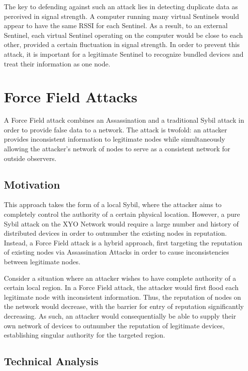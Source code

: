 \documentclass{article}
\begin{document}
The key to defending against such an attack lies in detecting duplicate data as perceived in signal strength. A computer running many virtual Sentinels would appear to have the same RSSI for each Sentinel. As a result, to an external Sentinel, each virtual Sentinel operating on the computer would be close to each other, provided a certain fluctuation in signal strength. In order to prevent this attack, it is important for a legitimate Sentinel to recognize bundled devices and treat their information as one node.

\section{Force Field Attacks}
A Force Field attack combines an Assassination and a traditional Sybil attack in order to provide false data to a network. The attack is twofold: an attacker provides inconsistent information to legitimate nodes while simultaneously allowing the attacker's network of nodes to serve as a consistent network for outside observers.

\subsection{Motivation}

This approach takes the form of a local Sybil, where the attacker aims to completely control the authority of a certain physical location. However, a pure Sybil attack on the XYO Network would require a large number and history of distributed devices in order to outnumber the existing nodes in reputation. Instead, a Force Field attack is a hybrid approach, first targeting the reputation of existing nodes via Assassination Attacks in order to cause inconsistencies between legitimate nodes.

Consider a situation where an attacker wishes to have complete authority of a certain local region. In a Force Field attack, the attacker would first flood each legitimate node with inconsistent information. Thus, the reputation of nodes on the network would decrease, with the barrier for entry of reputation significantly decreasing. As such, an attacker would consequentially be able to supply their own network of devices to outnumber the reputation of legitimate devices, establishing singular authority for the targeted region. 

\subsection{Technical Analysis}
\end{document}
